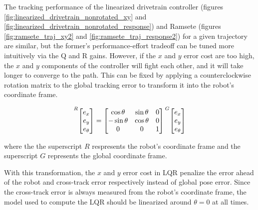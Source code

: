 The tracking performance of the linearized drivetrain controller (figures
\ref{fig:linearized_drivetrain_nonrotated_xy} and
\ref{fig:linearized_drivetrain_nonrotated_response}) and Ramsete (figures
\ref{fig:ramsete_traj_xy2} and \ref{fig:ramsete_traj_response2}) for a given
trajectory are similar, but the former's performance-effort tradeoff can be
tuned more intuitively via the Q and R gains. However, if the $x$ and $y$ error
cost are too high, the $x$ and $y$ components of the controller will fight each
other, and it will take longer to converge to the path. This can be fixed by
applying a counterclockwise rotation matrix to the global tracking error to
transform it into the robot's coordinate frame.

\begin{equation*}
  \prescript{R}{}{\begin{bmatrix}
    e_x \\
    e_y \\
    e_\theta
  \end{bmatrix}} =
  \begin{bmatrix}
    \cos\theta & \sin\theta & 0 \\
    -\sin\theta & \cos\theta & 0 \\
    0 & 0 & 1
  \end{bmatrix}
  \prescript{G}{}{\begin{bmatrix}
    e_x \\
    e_y \\
    e_\theta
  \end{bmatrix}}
\end{equation*}

where the the superscript $R$ respresents the robot's coordinate frame and the
superscript $G$ represents the global coordinate frame.

With this transformation, the $x$ and $y$ error cost in LQR penalize the error
ahead of the robot and cross-track error respectively instead of global pose
error. Since the cross-track error is always measured from the robot's
coordinate frame, the \gls{model} used to compute the LQR should be linearized
around $\theta = 0$ at all times.

